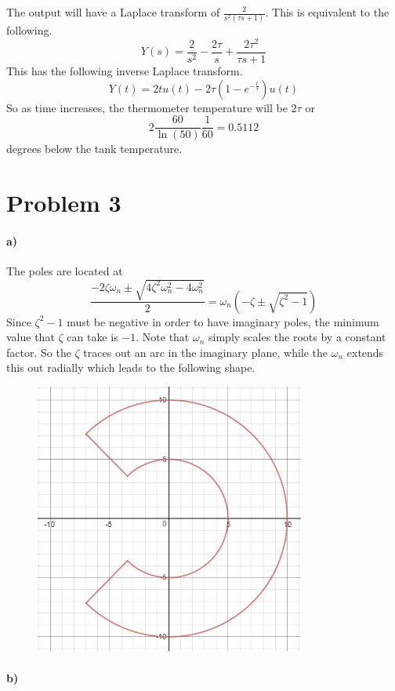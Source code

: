 \documentclass[12pt]{article}
\begin{document}
The output will have a Laplace transform of \(\frac{2}{s^2(\tau s+1)}\). This is equivalent to the following.
\[Y(s)= \frac{2}{s^2}-\frac{2\tau}{ s} + \frac{2\tau^2}{\tau s + 1}\]
This has the following inverse Laplace transform.
\[Y(t)= 2tu(t)-2\tau(1-e^{-\frac{t}{\tau}})u(t)\]
So as time increases, the thermometer temperature will be \(2\tau\) or
\[2\frac{60}{\ln(50)}\frac{1}{60} = 0.5112\]
degrees below the tank temperature.

\section*{Problem 3}

\paragraph{a)}

The poles are located at
\[\frac{-2\zeta\omega_n\pm\sqrt{4\zeta^2\omega_n^2-4\omega_n^2}}{2}=\omega_n(-\zeta\pm\sqrt{\zeta^2-1})\]
Since \(\zeta^2-1\) must be negative in order to have imaginary poles, the minimum value that \(\zeta\) can take
is \(-1\). Note that \(\omega_n\) simply scales the roots by a constant factor. So the \(\zeta\) traces out an arc
in the imaginary plane, while the \(\omega_n\) extends this out radially which leads to the following shape.
\begin{figure}[H]
    \begin{center}
        \includegraphics[width=3.5in]{problem3a.png}
    \end{center}
\end{figure}

\paragraph{b)}
\end{document}

